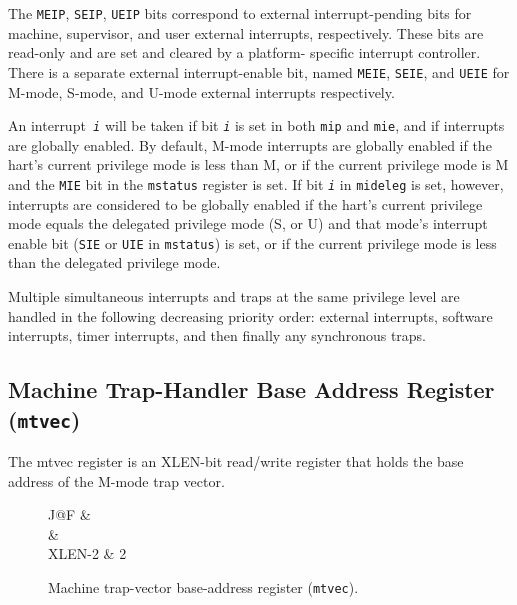 The \texttt{MEIP}, \texttt{SEIP}, \texttt{UEIP} bits correspond to external
interrupt-pending bits for machine, supervisor, and user external interrupts,
respectively. These bits are read-only and are set and cleared by a platform-
specific interrupt controller. There is a separate external interrupt-enable
bit, named \texttt{MEIE}, \texttt{SEIE}, and \texttt{UEIE} for M-mode, S-mode,
and U-mode external interrupts respectively.

An interrupt\texttt{ \emph{i}} will be taken if bit \texttt{\emph{i}} is set in
both \texttt{mip} and \texttt{mie}, and if interrupts are globally enabled. By
default, M-mode interrupts are globally enabled if the hart's current privilege
mode is less than M, or if the current privilege mode is M and the \texttt{MIE}
bit in the \texttt{mstatus} register is set. If bit \texttt{\emph{i}} in
\texttt{mideleg} is set, however, interrupts are considered to be globally
enabled if the hart's current privilege mode equals the delegated privilege mode
(S, or U) and that mode's interrupt enable bit (\texttt{SIE} or \texttt{UIE} in
\texttt{mstatus}) is set, or if the current privilege mode is less than the
delegated privilege mode.

Multiple simultaneous interrupts and traps at the same privilege level
are handled in the following decreasing priority order: external
interrupts, software interrupts, timer interrupts, and then finally any
synchronous traps.

\subsection{Machine Trap-Handler Base Address Register
(\texttt{mtvec})}\label{machine-trap-handler-base-address-register-mtvec}

The mtvec register is an XLEN-bit read/write register that holds the
base address of the M-mode trap vector.

\ifdefined\MARKDOWN
\else

\begin{figure*}[htb]
	{\footnotesize
		\begin{center}
			\begin{tabular}{J@{}F}
				 &
				 \\
				\hline
				 &
				 \\
				\hline
				XLEN-2 & 2 \\
			\end{tabular}
		\end{center}
	}
	\vspace{-0.1in}
	\caption{Machine trap-vector base-address register (\texttt{mtvec}).}
	\label{fig:mtvecreg}
\end{figure*}

